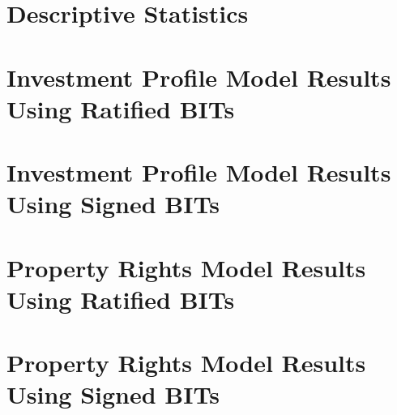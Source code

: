 \section{Descriptive Statistics}



\newpage

\section{Investment Profile Model Results Using Ratified BITs}

  
\FloatBarrier
\newpage

\section{Investment Profile Model Results Using Signed BITs}
  
\FloatBarrier

\newpage

\section{Property Rights Model Results Using Ratified BITs}
  
\FloatBarrier
\newpage

\section{Property Rights Model Results Using Signed BITs}
  
\FloatBarrier